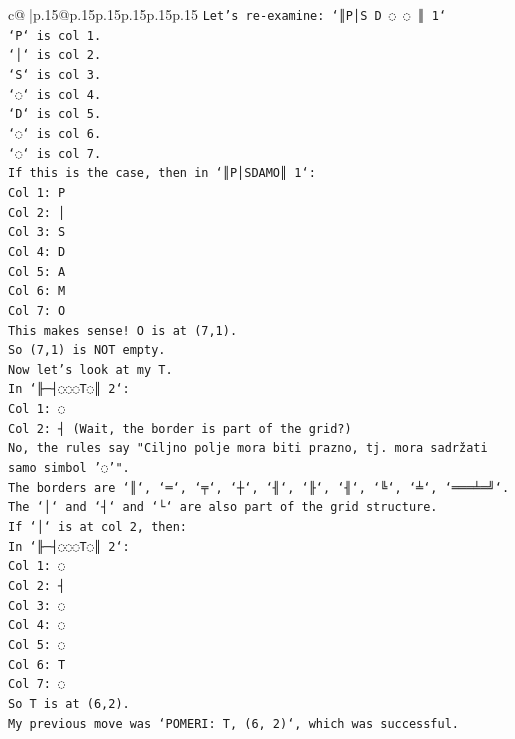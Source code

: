 \documentclass{article}
\begin{document}
{\begin{supertabular}{c@{$\;$}|p{.15\linewidth}@{}p{.15\linewidth}p{.15\linewidth}p{.15\linewidth}p{.15\linewidth}p{.15\linewidth}}
{{{\texttt{Let's re{-}examine: `║P│S D ◌ ◌ ║ 1`} \\
\texttt{`P` is col 1.} \\
\texttt{`│` is col 2.} \\
\texttt{`S` is col 3.} \\
\texttt{`◌` is col 4.} \\
\texttt{`D` is col 5.} \\
\texttt{`◌` is col 6.} \\
\texttt{`◌` is col 7.} \\
\texttt{If this is the case, then in `║P│SDAMO║ 1`:} \\
\texttt{Col 1: P} \\
\texttt{Col 2: │} \\
\texttt{Col 3: S} \\
\texttt{Col 4: D} \\
\texttt{Col 5: A} \\
\texttt{Col 6: M} \\
\texttt{Col 7: O} \\
\texttt{This makes sense! O is at (7,1).} \\
\texttt{So (7,1) is NOT empty.} \\
\texttt{Now let's look at my T.} \\
\texttt{In `╟─┤◌◌◌T◌║ 2`:} \\
\texttt{Col 1: ◌} \\
\texttt{Col 2: ┤ (Wait, the border is part of the grid?)} \\
\texttt{No, the rules say "Ciljno polje mora biti prazno, tj. mora sadržati samo simbol '◌'".} \\
\texttt{The borders are `║`, `═`, `╤`, `┼`, `╢`, `╟`, `╢`, `╚`, `╧`, `═══╧═╝`.} \\
\texttt{The `│` and `┤` and `└` are also part of the grid structure.} \\
\texttt{If `│` is at col 2, then:} \\
\texttt{In `╟─┤◌◌◌T◌║ 2`:} \\
\texttt{Col 1: ◌} \\
\texttt{Col 2: ┤} \\
\texttt{Col 3: ◌} \\
\texttt{Col 4: ◌} \\
\texttt{Col 5: ◌} \\
\texttt{Col 6: T} \\
\texttt{Col 7: ◌} \\
\texttt{So T is at (6,2).} \\
\texttt{My previous move was `POMERI: T, (6, 2)`, which was successful.} \\
}}}
\end{supertabular}}
\end{document}

